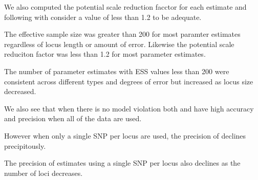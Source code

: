 We also computed the potential scale reduction facctor for each estimate and following 
with \citep{gelman1998} consider a value of less than 1.2 to be adequate. 

The effective sample size was greater than 200 for most \ecoevolity paramter estimates
regardless of locus length or amount of error. 
Likewise the potential scale reduciton factor was less than 1.2 for most \ecoevolity parameter estimates.

The number of \beast parameter estimates with ESS values less than 200 were consistent across
different types and degrees of error but increased as locus size decreased. 







We also see that when there is no model violation both \ecoevolity and \beast
have high accuracy and precision when all of the data are used. 

However when only a single SNP per locus are used, the precision of \ecoevolity 
declines precipitously.

The precision of \ecoevolity estimates using a single SNP per locus also declines 
as the number of loci decreases.        













